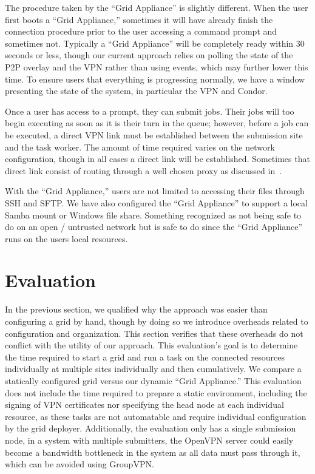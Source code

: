 \documentclass[conference]{IEEEtran}
\begin{document}
The procedure taken by the ``Grid Appliance'' is slightly different.  When the
user first boots a ``Grid Appliance,'' sometimes it will have already finish
the connection procedure prior to the user accessing a command prompt and
sometimes not.  Typically a ``Grid Appliance'' will be completely ready within
30 seconds or less, though our current approach relies on polling the state of
the P2P overlay and the VPN rather than using events, which may further lower
this time.  To ensure users that everything is progressing normally, we have a
window presenting the state of the system, in particular the VPN and Condor.

Once a user has access to a prompt, they can submit jobs.  Their jobs will too
begin executing as soon as it is their turn in the queue; however, before a job
can be executed, a direct VPN link must be established between the submission
site and the task worker.  The amount of time required varies on the network
configuration, though in all cases a direct link will be established.
Sometimes that direct link consist of routing through a well chosen proxy as
discussed in~\cite{groupvpn}.

With the ``Grid Appliance,'' users are not limited to accessing their files
through SSH and SFTP.  We have also configured the ``Grid Appliance'' to
support a local Samba mount or Windows file share.  Something recognized as not
being safe to do on an open / untrusted network but is safe to do since the
``Grid Appliance'' runs on the users local resources.

\section{Evaluation}
\label{evaluation}

In the previous section, we qualified why the approach was easier than
configuring a grid by hand, though by doing so we introduce overheads related
to configuration and organization.  This section verifies that these overheads
do not conflict with the utility of our approach.  This evaluation's goal is to
determine the time required to start a grid and run a task on the connected
resources individually at multiple sites individually and then cumulatively.
We compare a statically configured grid versus our dynamic ``Grid Appliance.''
This evaluation does not include the time required to prepare a static
environment, including the signing of VPN certificates nor specifying the head
node at each individual resource, as these tasks are not automatable and
require individual configuration by the grid deployer.  Additionally, the
evaluation only has a single submission node, in a system with multiple
submitters, the OpenVPN server could easily become a bandwidth bottleneck in
the system as all data must pass through it, which can be avoided using
GroupVPN.
\end{document}
